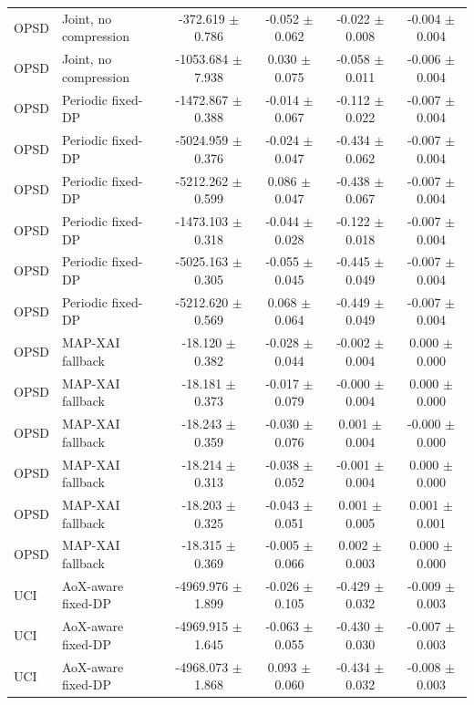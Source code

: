 \begin{tabular}{llcccc}
OPSD & Joint, no compression & -372.619 $\pm$ 0.786 & -0.052 $\pm$ 0.062 & -0.022 $\pm$ 0.008 & -0.004 $\pm$ 0.004 \\
OPSD & Joint, no compression & -1053.684 $\pm$ 7.938 & 0.030 $\pm$ 0.075 & -0.058 $\pm$ 0.011 & -0.006 $\pm$ 0.004 \\
OPSD & Periodic fixed-DP & -1472.867 $\pm$ 0.388 & -0.014 $\pm$ 0.067 & -0.112 $\pm$ 0.022 & -0.007 $\pm$ 0.004 \\
OPSD & Periodic fixed-DP & -5024.959 $\pm$ 0.376 & -0.024 $\pm$ 0.047 & -0.434 $\pm$ 0.062 & -0.007 $\pm$ 0.004 \\
OPSD & Periodic fixed-DP & -5212.262 $\pm$ 0.599 & 0.086 $\pm$ 0.047 & -0.438 $\pm$ 0.067 & -0.007 $\pm$ 0.004 \\
OPSD & Periodic fixed-DP & -1473.103 $\pm$ 0.318 & -0.044 $\pm$ 0.028 & -0.122 $\pm$ 0.018 & -0.007 $\pm$ 0.004 \\
OPSD & Periodic fixed-DP & -5025.163 $\pm$ 0.305 & -0.055 $\pm$ 0.045 & -0.445 $\pm$ 0.049 & -0.007 $\pm$ 0.004 \\
OPSD & Periodic fixed-DP & -5212.620 $\pm$ 0.569 & 0.068 $\pm$ 0.064 & -0.449 $\pm$ 0.049 & -0.007 $\pm$ 0.004 \\
OPSD & MAP-XAI fallback & -18.120 $\pm$ 0.382 & -0.028 $\pm$ 0.044 & -0.002 $\pm$ 0.004 & 0.000 $\pm$ 0.000 \\
OPSD & MAP-XAI fallback & -18.181 $\pm$ 0.373 & -0.017 $\pm$ 0.079 & -0.000 $\pm$ 0.004 & 0.000 $\pm$ 0.000 \\
OPSD & MAP-XAI fallback & -18.243 $\pm$ 0.359 & -0.030 $\pm$ 0.076 & 0.001 $\pm$ 0.004 & -0.000 $\pm$ 0.000 \\
OPSD & MAP-XAI fallback & -18.214 $\pm$ 0.313 & -0.038 $\pm$ 0.052 & -0.001 $\pm$ 0.004 & 0.000 $\pm$ 0.000 \\
OPSD & MAP-XAI fallback & -18.203 $\pm$ 0.325 & -0.043 $\pm$ 0.051 & 0.001 $\pm$ 0.005 & 0.001 $\pm$ 0.001 \\
OPSD & MAP-XAI fallback & -18.315 $\pm$ 0.369 & -0.005 $\pm$ 0.066 & 0.002 $\pm$ 0.003 & 0.000 $\pm$ 0.000 \\
UCI & AoX-aware fixed-DP & -4969.976 $\pm$ 1.899 & -0.026 $\pm$ 0.105 & -0.429 $\pm$ 0.032 & -0.009 $\pm$ 0.003 \\
UCI & AoX-aware fixed-DP & -4969.915 $\pm$ 1.645 & -0.063 $\pm$ 0.055 & -0.430 $\pm$ 0.030 & -0.007 $\pm$ 0.003 \\
UCI & AoX-aware fixed-DP & -4968.073 $\pm$ 1.868 & 0.093 $\pm$ 0.060 & -0.434 $\pm$ 0.032 & -0.008 $\pm$ 0.003 \\

\end{tabular}
